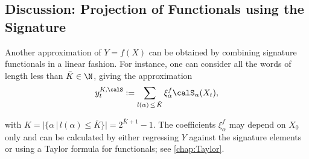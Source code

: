




\subsection{Discussion: Projection of Functionals using the Signature} \label{sec:sigFunc}

Another approximation of $Y=f(X)$ can be obtained by combining  signature functionals in a linear fashion. For instance, one can consider all the words of length less than $\bar{K} \in \N$, giving the approximation
  \begin{equation}\label{eq:sigPayoff}
      y^{K,\calS}_t := \sum_{l(\alpha)\, \le \, \bar{K}} \xi^f_{\alpha} \calS_{\alpha}(X_t), 
  \end{equation}
  \vspace{-3mm}
  
  with $K = |\{\alpha \, | \, l(\alpha)\le \bar{K}\}|=2^{\bar{K}+1}-1.$
  The coefficients $\xi^f_{\alpha}$ may depend on  $X_0$  only and can be  calculated by either regressing  $Y$ against the signature elements or using a Taylor formula for functionals; see \cref{chap:Taylor}.  %
     
